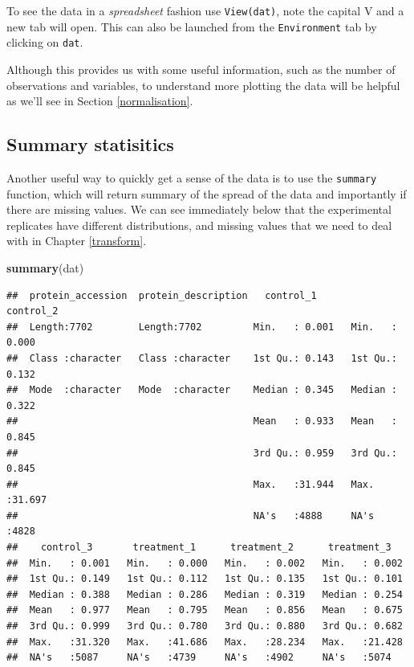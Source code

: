 \documentclass[12pt,]{book}
\newenvironment{Shaded}{\begin{snugshade}}{\end{snugshade}}
\newcommand{\KeywordTok}[1]{\textcolor[rgb]{0.13,0.29,0.53}{\textbf{#1}}}
\newcommand{\NormalTok}[1]{#1}
\begin{document}
To see the data in a \emph{spreadsheet} fashion use \texttt{View(dat)}, note the capital V
and a new tab will open. This can also be launched from the \texttt{Environment} tab by
clicking on \texttt{dat}.

Although this provides us with some useful information, such as the number of
observations and variables, to understand more plotting the data will be
helpful as we'll see in Section \ref{normalisation}.

\hypertarget{summary-statisitics}{%
\subsection{Summary statisitics}\label{summary-statisitics}}

Another useful way to quickly get a sense of the data is to use the \texttt{summary}
function, which will return summary of the spread of the data and importantly
if there are missing values. We can see immediately below that the experimental
replicates have different distributions, and missing values that we need to
deal with in Chapter \ref{transform}.

\begin{Shaded}
\begin{Highlighting}[]
\KeywordTok{summary}\NormalTok{(dat)}
\end{Highlighting}
\end{Shaded}

\begin{verbatim}
##  protein_accession  protein_description   control_1        control_2     
##  Length:7702        Length:7702         Min.   : 0.001   Min.   : 0.000  
##  Class :character   Class :character    1st Qu.: 0.143   1st Qu.: 0.132  
##  Mode  :character   Mode  :character    Median : 0.345   Median : 0.322  
##                                         Mean   : 0.933   Mean   : 0.845  
##                                         3rd Qu.: 0.959   3rd Qu.: 0.845  
##                                         Max.   :31.944   Max.   :31.697  
##                                         NA's   :4888     NA's   :4828    
##    control_3       treatment_1      treatment_2      treatment_3    
##  Min.   : 0.001   Min.   : 0.000   Min.   : 0.002   Min.   : 0.002  
##  1st Qu.: 0.149   1st Qu.: 0.112   1st Qu.: 0.135   1st Qu.: 0.101  
##  Median : 0.388   Median : 0.286   Median : 0.319   Median : 0.254  
##  Mean   : 0.977   Mean   : 0.795   Mean   : 0.856   Mean   : 0.675  
##  3rd Qu.: 0.999   3rd Qu.: 0.780   3rd Qu.: 0.880   3rd Qu.: 0.682  
##  Max.   :31.320   Max.   :41.686   Max.   :28.234   Max.   :21.428  
##  NA's   :5087     NA's   :4739     NA's   :4902     NA's   :5074
\end{verbatim}
\end{document}
